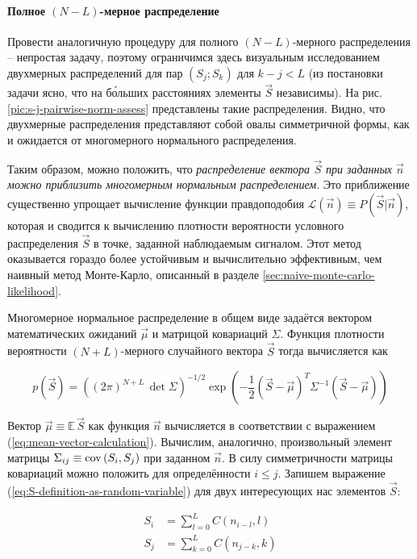 \paragraph{Полное $(N-L)$-мерное распределение}
Провести аналогичную процедуру для полного $(N-L)$-мерного распределения -- непростая задачу, поэтому ограничимся здесь визуальным исследованием двухмерных распределений для пар $(S_j; S_k)$ для $k - j < L$ (из постановки задачи ясно, что на б\'{о}льших расстояниях элементы $\vec{S}$ независимы). На рис. \ref{pic:s-j-pairwise-norm-assess} представлены такие распределения. Видно, что двухмерные распределения представляют собой овалы симметричной формы, как и ожидается от многомерного нормального распределения.

Таким образом, можно положить, что \textit{распределение вектора $\vec{S}$ при заданных $\vec{n}$ можно приблизить многомерным нормальным распределением}. Это приближение существенно упрощает вычисление функции правдоподобия $\mathcal{L}(\vec{n}) \equiv P(\vec{S} | \vec{n})$, которая и сводится к вычислению плотности вероятности условного распределения $\vec{S}$ в точке, заданной наблюдаемым сигналом. Этот метод оказывается гораздо более устойчивым и вычислительно эффективным, чем наивный метод Монте-Карло, описанный в разделе \ref{sec:naive-monte-carlo-likelihood}.

Многомерное нормальное распределение в общем виде задаётся вектором математических ожиданий $\vec{\mu}$ и матрицой ковариаций $\Sigma$. Функция плотности вероятности $(N+L)$-мерного случайного вектора $\vec{S}$ тогда вычисляется как

\begin{equation}
	\label{eq:multivariate-normal-density}
	p(\vec{S}) = \left( (2 \pi)^{N+L} \, \det \Sigma \right)^{-1/2} \exp \left( - \frac{1}{2} (\vec{S} - \vec{\mu})^T \Sigma^{-1} (\vec{S} - \vec{\mu}) \right)
\end{equation}

Вектор $\vec{\mu} \equiv \mathbb{E} \, \vec{S}$ как функция $\vec{n}$ вычисляется в соответствии с выражением (\ref{eq:mean-vector-calculation}). Вычислим, аналогично, произвольный элемент матрицы $\Sigma_{ij} \equiv \mathrm{cov}\left( S_i, S_j \right)$ при заданном $\vec{n}$. В силу симметричности матрицы ковариаций можно положить для определённости $i \le j$. Запишем выражение (\ref{eq:S-definition-as-random-variable}) для двух интересующих нас элементов $\vec{S}$:

\begin{align}
	S_i &= \sum_{l=0}^{L} C(n_{i-l}, l)\\
	S_j &= \sum_{k=0}^{L} C(n_{j-k}, k)
\end{align}


